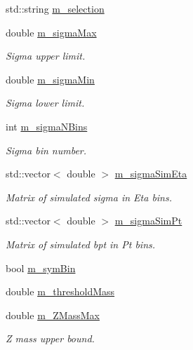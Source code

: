 \begin{DoxyCompactItemize}
std\+::string \hyperlink{classTemplateMethod_1_1Setting_a27283e106cd773f1330b134e373fb092}{m\+\_\+selection}
\item 
double \hyperlink{classTemplateMethod_1_1Setting_a7937a5006644ba54017505e4b0391373}{m\+\_\+sigma\+Max}
\begin{DoxyCompactList}\small\item\em Sigma upper limit. \end{DoxyCompactList}\item 
double \hyperlink{classTemplateMethod_1_1Setting_af8250b530131b08cb2399716ca64562b}{m\+\_\+sigma\+Min}
\begin{DoxyCompactList}\small\item\em Sigma lower limit. \end{DoxyCompactList}\item 
int \hyperlink{classTemplateMethod_1_1Setting_a0ed9947acbbea42c33ef4c812101ddf1}{m\+\_\+sigma\+N\+Bins}
\begin{DoxyCompactList}\small\item\em Sigma bin number. \end{DoxyCompactList}\item 
std\+::vector$<$ double $>$ \hyperlink{classTemplateMethod_1_1Setting_ae68c7131daddbc2abb2c29b670a67d32}{m\+\_\+sigma\+Sim\+Eta}
\begin{DoxyCompactList}\small\item\em Matrix of simulated sigma in Eta bins. \end{DoxyCompactList}\item 
std\+::vector$<$ double $>$ \hyperlink{classTemplateMethod_1_1Setting_ae08f5a1393cd6844bfb2d25321c3c8a5}{m\+\_\+sigma\+Sim\+Pt}
\begin{DoxyCompactList}\small\item\em Matrix of simulated bpt in Pt bins. \end{DoxyCompactList}\item 
bool \hyperlink{classTemplateMethod_1_1Setting_a8beae6e50ba9de6646a209b8deb1412f}{m\+\_\+sym\+Bin}
\item 
double \hyperlink{classTemplateMethod_1_1Setting_a78c0c7825975e8d0b71506576b6bb8f9}{m\+\_\+threshold\+Mass}
\item 
double \hyperlink{classTemplateMethod_1_1Setting_a5ecf331d9ed570302e50cacad968256a}{m\+\_\+\+Z\+Mass\+Max}
\begin{DoxyCompactList}\small\item\em Z mass upper bound. \end{DoxyCompactList}\item 

\end{DoxyCompactItemize}
